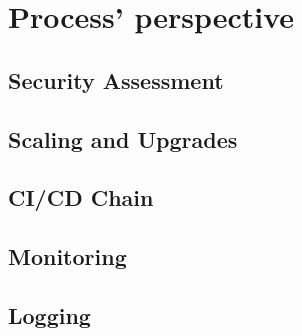 \section{Process' perspective}
\subsection{Security Assessment}


\subsection{Scaling and Upgrades}


\subsection{CI/CD Chain}\label{cicd}


\subsection{Monitoring}


\subsection{Logging}
